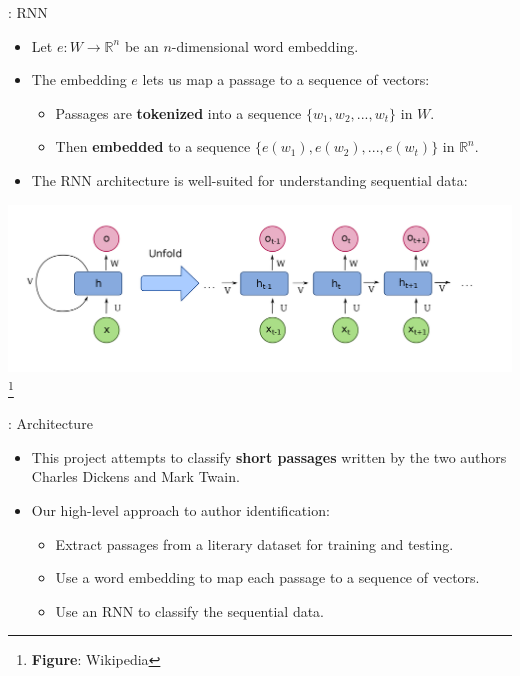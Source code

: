 \documentclass{beamer}
\newcommand\blfootnote[1]{%
  \begingroup
  \renewcommand\thefootnote{}\footnote{#1}%
  \addtocounter{footnote}{-1}%
  \endgroup
}
\begin{document}
\begin{frame}{\secname: RNN}
\begin{itemize}
\item 
Let $e: W \rightarrow \mathbb{R}^n$ be an $n$-dimensional word embedding.

\item
The embedding $e$ lets us map a passage to a sequence of vectors:
\begin{itemize}
\item 
Passages are \textbf{tokenized} into a sequence $\{w_1, w_2, ..., w_t\}$ in $W$.

\item
Then \textbf{embedded} to a sequence $\{e(w_1), e(w_2), ..., e(w_t)\}$ in $\mathbb{R}^n$.
\end{itemize}

\item
The RNN architecture is well-suited for understanding sequential data:
\end{itemize}

\includegraphics[width=\textwidth]{images/rnn.png}
\blfootnote{\textbf{Figure}: Wikipedia}
\end{frame}

\begin{frame}{\secname: Architecture}
\begin{itemize}

\item This project attempts to classify \textbf{short passages} written by the two authors Charles Dickens and Mark Twain.

\item 
Our high-level approach to author identification:

    \begin{itemize}
    \item 
    Extract passages from a literary dataset for training and testing.
    
    \item
    Use a word embedding to map each passage to a sequence of vectors.
    
    \item 
    Use an RNN to classify the sequential data.
    \end{itemize}
\end{itemize}
\end{frame}
\end{document}
